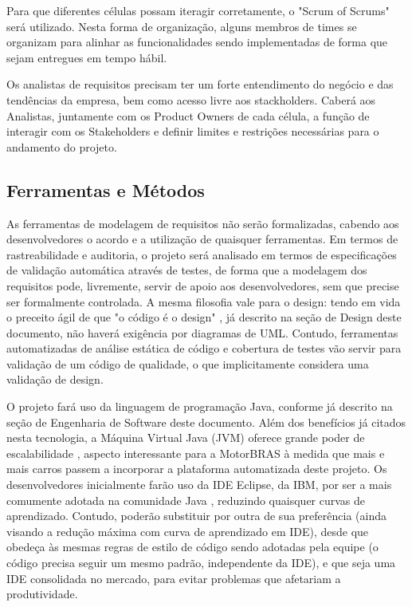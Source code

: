\documentclass[12pt,journal,compsoc]{IEEEtran}
\begin{document}
Para que diferentes células possam iteragir corretamente, o "Scrum of Scrums" será utilizado. Nesta forma de organização, alguns membros de times se organizam para alinhar as funcionalidades sendo implementadas de forma que sejam entregues em tempo hábil. \cite{backmann_nord_ozkaya_2012}

Os analistas de requisitos precisam ter um forte entendimento do negócio e das tendências da empresa, bem como acesso livre aos stackholders. Caberá aos Analistas, juntamente com os Product Owners de cada célula, a função de interagir com os Stakeholders e definir limites e restrições necessárias para o andamento do projeto.

\subsection{Ferramentas e Métodos}

As ferramentas de modelagem de requisitos não serão formalizadas, cabendo aos desenvolvedores o acordo e a utilização de quaisquer ferramentas. Em termos de rastreabilidade e auditoria, o projeto será analisado em termos de especificações de validação automática através de testes, de forma que a modelagem dos requisitos pode, livremente, servir de apoio aos desenvolvedores, sem que precise ser formalmente controlada. A mesma filosofia vale para o design: tendo em vida o preceito ágil de que "o código é o design" \cite{fowler_design_dead}, já descrito na seção de Design deste documento, não haverá exigência por diagramas de UML. Contudo, ferramentas automatizadas de análise estática de código e cobertura de testes vão servir para validação de um código de qualidade, o que implicitamente considera uma validação de design.

O projeto fará uso da linguagem de programação Java, conforme já descrito na seção de Engenharia de Software deste documento. Além dos benefícios já citados nesta tecnologia, a Máquina Virtual Java (JVM) oferece grande poder de escalabilidade \cite{10.1109/IISWC.2005.1526008}, aspecto interessante para a MotorBRAS à medida que mais e mais carros passem a incorporar a plataforma automatizada deste projeto. Os desenvolvedores inicialmente farão uso da IDE Eclipse, da IBM, por ser a mais comumente adotada na comunidade Java \cite{java_report_2012}, reduzindo quaisquer curvas de aprendizado. Contudo, poderão substituir por outra de sua preferência (ainda visando a redução máxima com curva de aprendizado em IDE), desde que obedeça às mesmas regras de estilo de código sendo adotadas pela equipe (o código precisa seguir um mesmo padrão, independente da IDE), e que seja uma IDE consolidada no mercado, para evitar problemas que afetariam a produtividade.   
\end{document}

